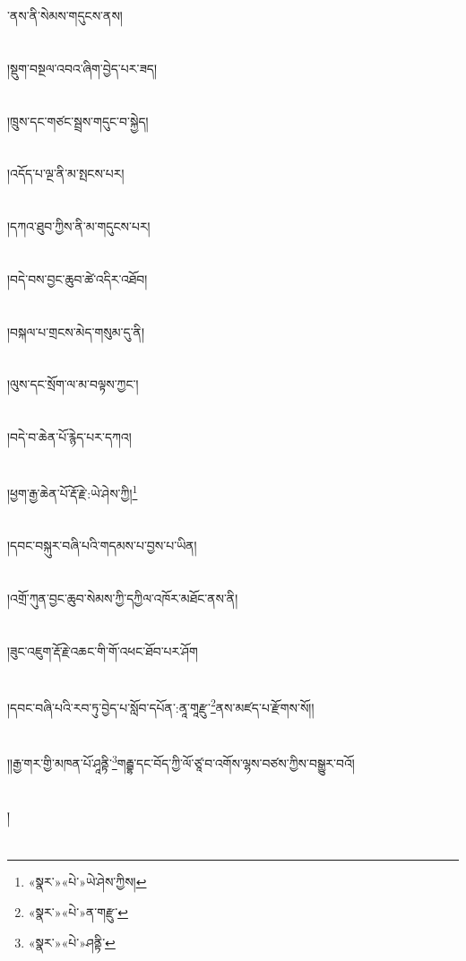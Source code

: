 ་ནས་ནི་སེམས་གདུངས་ནས།\chapter{ }།སྡུག་བསྔལ་འབའ་ཞིག་བྱེད་པར་ཟད།\chapter{ }།ཁྲུས་དང་གཙང་སྦྲས་གདུང་བ་སྐྱེད།\chapter{ }།འདོད་པ་ལྔ་ནི་མ་སྤངས་པར།\chapter{ }།དཀའ་ཐུབ་ཀྱིས་ནི་མ་གདུངས་པར།\chapter{ }།བདེ་བས་བྱང་ཆུབ་ཚེ་འདིར་འཐོབ།\chapter{ }།བསྐལ་པ་གྲངས་མེད་གསུམ་དུ་ནི།\chapter{ }།ལུས་དང་སྲོག་ལ་མ་བལྟས་ཀྱང་།\chapter{ }།བདེ་བ་ཆེན་པོ་རྙེད་པར་དཀའ།\chapter{ }།ཕྱག་རྒྱ་ཆེན་པོ་རྡོ་རྗེ་:ཡེ་ཤེས་ཀྱི།\footnote{«སྣར་»«པེ་»ཡེ་ཤེས་ཀྱིས།}\chapter{ }།དབང་བསྐུར་བཞི་པའི་གདམས་པ་བྱས་པ་ཡིན།\chapter{ }།འགྲོ་ཀུན་བྱང་ཆུབ་སེམས་ཀྱི་དཀྱིལ་འཁོར་མཐོང་ནས་ནི།\chapter{ }།ཟུང་འཇུག་རྡོ་རྗེ་འཆང་གི་གོ་འཕང་ཐོབ་པར་ཤོག\chapter{ }།དབང་བཞི་པའི་རབ་ཏུ་བྱེད་པ་སློབ་དཔོན་:ནཱ་གཱརྫུ་\footnote{«སྣར་»«པེ་»ན་གརྫུ་}ནས་མཛད་པ་རྫོགས་སོ།།\chapter{ }།།རྒྱ་གར་གྱི་མཁན་པོ་ཤཱནྟི་\footnote{«སྣར་»«པེ་»ཤནྟི་}གརྦྷ་དང་བོད་ཀྱི་ལོ་ཙཱ་བ་འགོས་ལྷས་བཙས་ཀྱིས་བསྒྱུར་བའོ།\chapter{ }།\chapter{ }